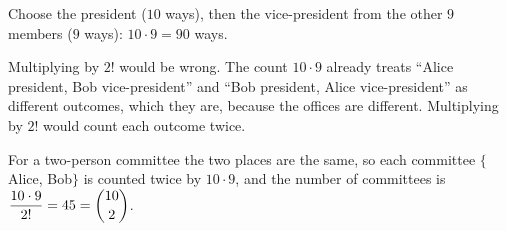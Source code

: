 Choose the president ($10$ ways), then the vice-president from the other $9$ members ($9$ ways): $10\cdot9=\boxed{90}$ ways.

Multiplying by $2!$ would be wrong. The count $10\cdot9$ already treats ``Alice president, Bob vice-president'' and ``Bob president, Alice vice-president'' as different outcomes, which they are, because the offices are different. Multiplying by $2!$ would count each outcome twice.

For a two-person committee the two places are the same, so each committee $\{$Alice, Bob$\}$ is counted twice by $10\cdot9$, and the number of committees is $\dfrac{10\cdot9}{2!}=45=\dbinom{10}{2}$.
